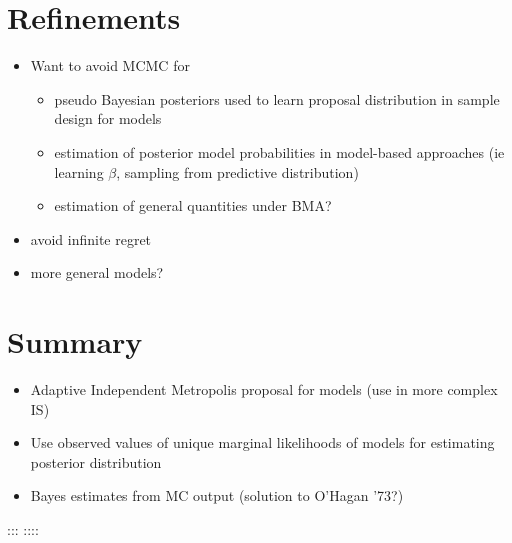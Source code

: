 \documentclass[
]{report}
\providecommand{\tightlist}{%
  \setlength{\itemsep}{0pt}\setlength{\parskip}{0pt}}\usepackage{longtable,booktabs,array}
\newcommand{\1}{\mathbf{1}_n}
\begin{document}
\section{Refinements}\label{refinements}

\begin{itemize}
\item
  Want to avoid MCMC for

  \begin{itemize}
  \tightlist
  \item
    pseudo Bayesian posteriors used to learn proposal distribution in
    sample design for models
  \item
    estimation of posterior model probabilities in model-based
    approaches (ie learning \(\beta\), sampling from predictive
    distribution)
  \item
    estimation of general quantities under BMA?
  \end{itemize}
\item
  avoid infinite regret
\item
  more general models?
\end{itemize}

\section{Summary}\label{summary}

\begin{itemize}
\tightlist
\item
  Adaptive Independent Metropolis proposal for models (use in more
  complex IS)
\item
  Use observed values of unique marginal likelihoods of models for
  estimating posterior distribution
\item
  Bayes estimates from MC output (solution to O'Hagan '73?)
\end{itemize}

::: ::::
\end{document}
